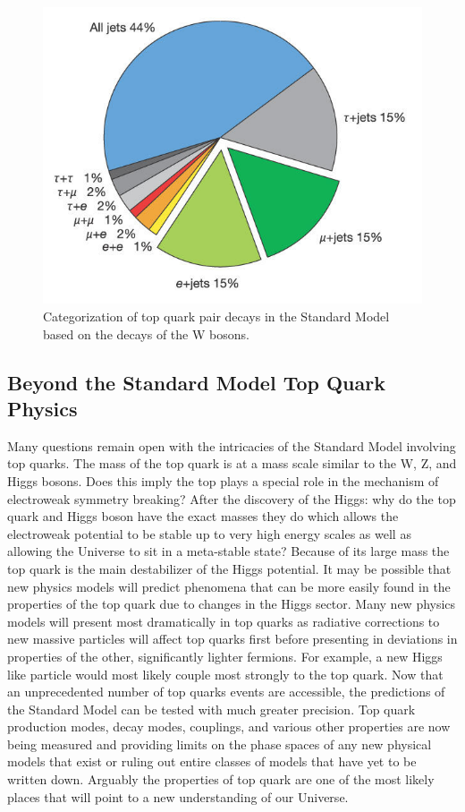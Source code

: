 \begin{figure}[h!]
	\centering
	\includegraphics[width=.5\columnwidth]{../ThesisImages/Theory/topdecayproducts.jpg}
	\caption[Categorization of top quark pair decays in the Standard Model based on the decays of the W bosons.]{Categorization of top quark pair decays in the Standard Model based on the decays of the W bosons\cite{Abazov:2004cs}.}
	\label{fig:ttdecayprods}
\end{figure}


\subsection{Beyond the Standard Model Top Quark Physics}

Many questions remain open with the intricacies of the Standard Model involving top quarks.  The mass of the top quark is at a mass scale similar to the W, Z, and Higgs bosons.  Does this imply the top plays a special role in the mechanism of electroweak symmetry breaking?  After the discovery of the Higgs: why do the top quark and Higgs boson have the exact masses they do which allows the electroweak potential to be stable up to very high energy scales as well as allowing the Universe to sit in a meta-stable state\cite{TopReview}?  Because of its large mass the top quark is the main destabilizer of the Higgs potential.  It may be possible that new physics models will predict phenomena that can be more easily found in the properties of the top quark due to changes in the Higgs sector.  Many new physics models will present most dramatically in top quarks as radiative corrections to new massive particles will affect top quarks first before presenting in deviations in properties of the other, significantly lighter fermions.  For example, a new Higgs like particle would most likely couple most strongly to the top quark.  
 Now that an unprecedented number of top quarks events are accessible, the predictions of the Standard Model can be tested with much greater precision.  Top quark production modes, decay modes, couplings, and various other properties are now being measured and providing limits on the phase spaces of any new physical models that exist or ruling out entire classes of models that have yet to be written down.  Arguably the properties of top quark are one of the most likely places that will point to a new understanding of our Universe.

